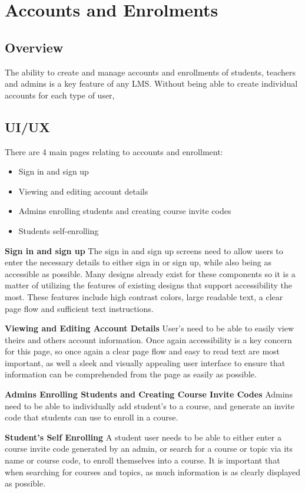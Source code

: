 \section{Accounts and Enrolments}
\subsection{Overview}
The ability to create and manage accounts and enrollments of students, teachers and admins is a key feature of any LMS. Without being able to create individual accounts for each type of user, 

\subsection{UI/UX}
There are 4 main pages relating to accounts and enrollment:
\begin{itemize}
  \item Sign in and sign up
  \item Viewing and editing account details
  \item Admins enrolling students and creating course invite codes
  \item Students self-enrolling
\end{itemize}

\textbf{Sign in and sign up}
The sign in and sign up screens need to allow users to enter the necessary details to either sign in or sign up, while also being as accessible as possible. Many designs already exist for these components so it is a matter of utilizing the features of existing designs that support accessibility the most. These features include high contrast colors, large readable text, a clear page flow and sufficient text instructions.

\textbf{Viewing and Editing Account Details}
User's need to be able to easily view theirs and others account information. Once again accessibility is a key concern for this page, so once again a clear page flow and easy to read text are most important, as well a sleek and visually appealing user interface to ensure that information can be comprehended from the page as easily as possible.

\textbf{Admins Enrolling Students and Creating Course Invite Codes}
Admins need to be able to individually add student's to a course, and generate an invite code that students can use to enroll in a course. 

\textbf{Student's Self Enrolling}
A student user needs to be able to either enter a course invite code generated by an admin, or search for a course or topic via its name or course code, to enroll themselves into a course. It is important that when searching for courses and topics, as much information is as clearly displayed as possible.

